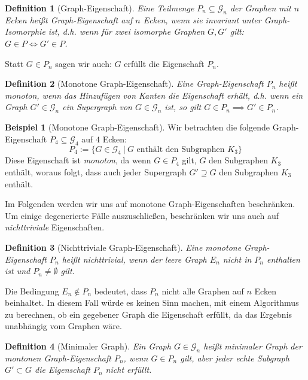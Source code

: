 \documentclass[10pt,a4paper, footheight=1mm, bibliography=totoc]{scrreprt}
\newtheorem{definition}{Definition}
\theoremstyle{definition}
\newtheorem{examplex}{Beispiel}
\newenvironment{example}[1]
{ \begin{leftbar} \begin{examplex}#1}
{ \end{examplex} \ignorespacesafterend \end{leftbar} }
\begin{document}
\begin{definition}[Graph-Eigenschaft]
Eine Teilmenge $P_n \subseteq \mathcal{G}_n$ der Graphen mit
$n$ Ecken heißt \emph{Graph-Eigenschaft auf $n$ Ecken},
wenn sie invariant unter Graph-Isomorphie ist,
d.h. wenn für zwei isomorphe Graphen $G, G'$ gilt:
$G \in P \iff G' \in P$.
\end{definition}
Statt $G \in P_n$ sagen wir auch: $G$ erfüllt die Eigenschaft $P_n$.


\begin{definition}[Monotone Graph-Eigenschaft]
Eine Graph-Eigenschaft $P_n$ heißt \emph{monoton}, wenn das
Hinzufügen von Kanten die Eigenschaft erhält,
d.h. wenn ein Graph
$G' \in \mathcal{G}_n$ ein Supergraph von
$G \in \mathcal{G}_n$ ist, so gilt 
$G \in P_n \implies G' \in P_n$.
\end{definition}

\begin{example}[Monotone Graph-Eigenschaft]
\label{exmpl:Monotonie}
Wir betrachten die folgende Graph-Eigenschaft 
$P_4 \subseteq \mathcal{G}_4$ auf $4$ Ecken:
$$P_4 := \{ G \in \mathcal{G}_4 \ | \ G \text{ enthält den Subgraphen } K_3 \}$$
Diese Eigenschaft ist \emph{monoton}, da wenn 
$G \in P_4$ gilt, $G$ den Subgraphen $K_3$
enthält, woraus folgt, dass auch jeder Supergraph $G'\supseteq G$
den Subgraphen $K_3$ enthält. 
\end{example}

Im Folgenden werden wir uns auf monotone Graph-Eigenschaften beschränken.
Um einige degenerierte Fälle auszuschließen, beschränken
wir uns auch auf \emph{nichttriviale} Eigenschaften.
\begin{definition}[Nichttriviale Graph-Eigenschaft]
Eine monotone Graph-Eigenschaft $P_n$ heißt \emph{nichttrivial},
wenn der leere Graph $E_n$ nicht in $P_n$ enthalten ist und
$P_n\neq \emptyset$ gilt.
\end{definition}
Die Bedingung $E_n \notin P_n$ bedeutet, dass $P_n$ nicht
alle Graphen auf $n$ Ecken beinhaltet. In diesem Fall würde
es keinen Sinn machen, mit einem Algorithmus zu berechnen,
ob ein gegebener Graph die Eigenschaft erfüllt, da das Ergebnis
unabhängig vom Graphen wäre.

\begin{definition}[Minimaler Graph]
Ein Graph $G \in \mathcal{G}_n$ heißt
\emph{minimaler Graph der montonen Graph-Eigenschaft $P_n$},
wenn $G \in P_n$ gilt, aber jeder echte Subgraph 
$G' \subset G$ die Eigenschaft $P_n$ nicht erfüllt.
\end{definition}
\end{document}
